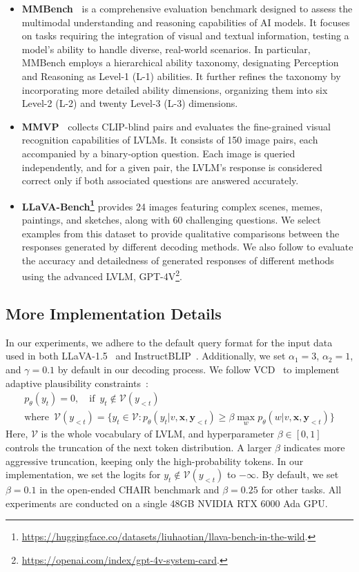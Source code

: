 \begin{itemize}
    \item \textbf{MMBench~\citep{liu2025mmbench}} is a comprehensive evaluation benchmark designed to assess the multimodal understanding and reasoning capabilities of AI models. It focuses on tasks requiring the integration of visual and textual information, testing a model's ability to handle diverse, real-world scenarios. In particular, MMBench employs a hierarchical ability taxonomy, designating Perception and Reasoning as Level-1 (L-1) abilities. It further refines the taxonomy by incorporating more detailed ability dimensions, organizing them into six Level-2 (L-2) and twenty Level-3 (L-3) dimensions.
    \item \textbf{MMVP~\citep{tong2024eyes}} collects CLIP-blind pairs and evaluates the fine-grained visual recognition capabilities of LVLMs. It consists of 150 image pairs, each accompanied by a binary-option question. Each image is queried independently, and for a given pair, the LVLM's response is considered correct only if both associated questions are answered accurately.
    \item \textbf{LLaVA-Bench\footnote{\url{https://huggingface.co/datasets/liuhaotian/llava-bench-in-the-wild}.}} provides 24 images featuring complex scenes, memes, paintings, and sketches, along with 60 challenging questions. We select examples from this dataset to provide qualitative comparisons between the responses generated by different decoding methods. We also follow \citet{yin2023woodpecker} to evaluate the accuracy and detailedness of generated responses of different methods using the advanced LVLM, GPT-4V\footnote{\url{https://openai.com/index/gpt-4v-system-card}.}.
\end{itemize}

\subsection{More Implementation Details}
In our experiments, we adhere to the default query format for the input data used in both LLaVA-1.5~\citep{liu2023visual} and InstructBLIP~\citep{dai2024instructblip}. Additionally, we set $\alpha_1 = 3$, $\alpha_2 = 1$, and $\gamma = 0.1$ by default in our decoding process. We follow VCD~\citep{leng2024mitigating} to implement adaptive plausibility constraints~\citep{li2023contrastive}:
\begin{gather}
p_{\theta}(y_t) = 0, \quad \text{if} \,\,\, y_t \notin \mathcal{V}(y_{<t})\nonumber\\
    \text{where}\,\,\,\mathcal{V}(y_{<t}) = \{y_t \in \mathcal{V}: p_{\theta}(y_t | v, \mathbf{x}, \mathbf{y}_{<t}) \geq \beta \max_w  p_{\theta}(w | v, \mathbf{x}, \mathbf{y}_{<t})\}
    \label{eq:adaptive}
\end{gather}
Here, $\mathcal{V}$ is the whole vocabulary of LVLM, and hyperparameter $\beta \in [0, 1]$ controls the truncation of the next token distribution. A larger $\beta$ indicates more aggressive truncation, keeping only the high-probability tokens. In our implementation, we set the logits for $y_t \notin \mathcal{V}(y_{<t})$ to $-\infty$. By default, we set $\beta=0.1$ in the open-ended CHAIR benchmark and $\beta=0.25$ for other tasks. All experiments are conducted on a single 48GB NVIDIA RTX 6000 Ada GPU. 

